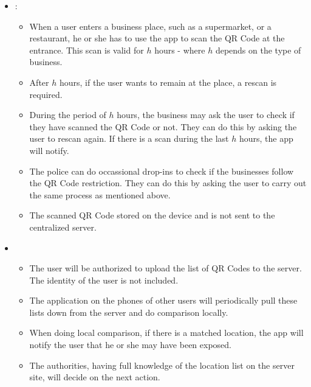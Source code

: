       \begin{itemize}
        \item {}:
          \begin{itemize}
            \item When a user enters a business place, such as a supermarket, or a restaurant, he or she has to use the app to scan the QR Code at the entrance. This scan is valid for $h$ hours - where $h$ depends on the type of business.
            \item After $h$ hours, if the user wants to remain at the place, a rescan is required.
            \item During the period of $h$ hours, the business may ask the user to check if they have scanned the QR Code or not. They can do this by asking the user to rescan again. If there is a scan during the last $h$ hours, the app will notify.
            \item The police can do occassional drop-ins to check if the businesses follow the QR Code restriction. They can do this by asking the user to carry out the same process as mentioned above.
            \item The scanned QR Code stored on the device and is not sent to the centralized server.
          \end{itemize}
        \item {}
          \begin{itemize}
            \item The user will be authorized to upload the list of QR Codes to the server. The identity of the user is not included.
            \item The application on the phones of other users will periodically pull these lists down from the server and do comparison locally.
            \item When doing local comparison, if there is a matched location, the app will notify the user that he or she may have been exposed.
            \item The authorities, having full knowledge of the location list on the server site, will decide on the next action.
          \end{itemize}
      \end{itemize}

